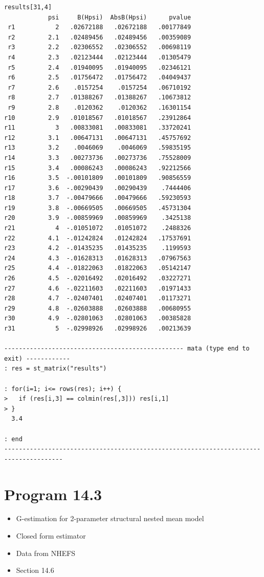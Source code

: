 \documentclass[
  10pt,
  a4paper,
]{book}
\providecommand{\tightlist}{%
  \setlength{\itemsep}{0pt}\setlength{\parskip}{0pt}}
\begin{document}
\begin{verbatim}
results[31,4]
            psi     B(Hpsi)  AbsB(Hpsi)      pvalue
 r1           2   .02672188   .02672188   .00177849
 r2         2.1   .02489456   .02489456   .00359089
 r3         2.2   .02306552   .02306552   .00698119
 r4         2.3   .02123444   .02123444   .01305479
 r5         2.4   .01940095   .01940095   .02346121
 r6         2.5   .01756472   .01756472   .04049437
 r7         2.6    .0157254    .0157254   .06710192
 r8         2.7   .01388267   .01388267   .10673812
 r9         2.8    .0120362    .0120362   .16301154
r10         2.9   .01018567   .01018567   .23912864
r11           3   .00833081   .00833081   .33720241
r12         3.1   .00647131   .00647131   .45757692
r13         3.2    .0046069    .0046069   .59835195
r14         3.3   .00273736   .00273736   .75528009
r15         3.4   .00086243   .00086243   .92212566
r16         3.5  -.00101809   .00101809   .90856559
r17         3.6  -.00290439   .00290439    .7444406
r18         3.7  -.00479666   .00479666   .59230593
r19         3.8  -.00669505   .00669505   .45731304
r20         3.9  -.00859969   .00859969    .3425138
r21           4  -.01051072   .01051072    .2488326
r22         4.1  -.01242824   .01242824   .17537691
r23         4.2  -.01435235   .01435235    .1199593
r24         4.3  -.01628313   .01628313   .07967563
r25         4.4  -.01822063   .01822063   .05142147
r26         4.5  -.02016492   .02016492   .03227271
r27         4.6  -.02211603   .02211603   .01971433
r28         4.7  -.02407401   .02407401   .01173271
r29         4.8  -.02603888   .02603888   .00680955
r30         4.9  -.02801063   .02801063   .00385828
r31           5  -.02998926   .02998926   .00213639

------------------------------------------------- mata (type end to exit) ------------
: res = st_matrix("results")

: for(i=1; i<= rows(res); i++) { 
>   if (res[i,3] == colmin(res[,3])) res[i,1]
> }
  3.4

: end
--------------------------------------------------------------------------------------
\end{verbatim}

\section{Program 14.3}\label{program-14.3-1}

\begin{itemize}
\tightlist
\item
  G-estimation for 2-parameter structural nested mean model
\item
  Closed form estimator
\item
  Data from NHEFS
\item
  Section 14.6
\end{itemize}
\end{document}
